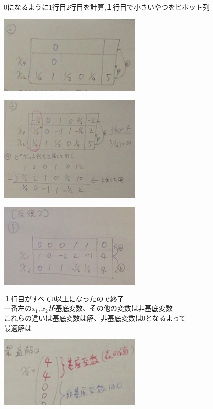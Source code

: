 \documentclass{jsarticle}
\begin{document}
{{{\begin{center}
	\end{center}
	0になるように1行目2行目を計算,１行目で小さいやつをピポット列
	\begin{center}
		\includegraphics[width=7cm]{1_7_8.JPG}
	\end{center}
	\begin{center}
		\includegraphics[width=7cm]{1_7_9.JPG}
	\end{center}
	\begin{center}
		\includegraphics[width=7cm]{1_7_10.JPG}
	\end{center}
	１行目がすべて0以上になったので終了\\
	一番左の$x_1,x_2$が基底変数、その他の変数は非基底変数\\
	これらの違いは基底変数は解、非基底変数は0となるよって\\
	最適解は
	\begin{center}
		\includegraphics[width=7cm]{1_7_11.JPG}

\end{center}}}}
\end{document}
